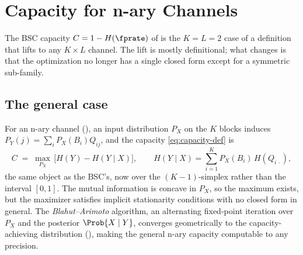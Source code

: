 %

\section{Capacity for n-ary Channels}
\label{sec:n-ary-capacity}

The BSC capacity $C = 1 - H(\fprate)$ of  is the
$K = L = 2$ case of a definition that lifts to any $K \times L$ channel. The
lift is mostly definitional; what changes is that the optimization no longer has
a single closed form except for a symmetric sub-family.

\subsection*{The general case}

For an n-ary channel (), an input distribution $P_X$ on
the $K$ blocks induces $P_Y(j) = \sum_{i} P_X(B_i) Q_{ij}$, and the capacity
\eqref{eq:capacity-def} is
\begin{equation}
\label{eq:n-ary-capacity-def}
  C \;=\; \max_{P_X}\, \bigl[ H(Y) - H(Y \mid X) \bigr],
  \qquad H(Y \mid X) = \sum_{i=1}^{K} P_X(B_i)\, H(Q_{i\,\cdot}),
\end{equation}
the same object as the BSC's, now over the $(K-1)$-simplex rather than the
interval $[0,1]$. The mutual information is concave in $P_X$, so the maximum
exists, but the maximizer satisfies implicit stationarity conditions with no
closed form in general. The \emph{Blahut--Arimoto} algorithm, an alternating
fixed-point iteration over $P_X$ and the posterior $\Prob{X \mid Y}$, converges
geometrically to the capacity-achieving distribution (\textcite[Ch.~10]{cover-thomas}),
making the general n-ary capacity computable to any precision.

